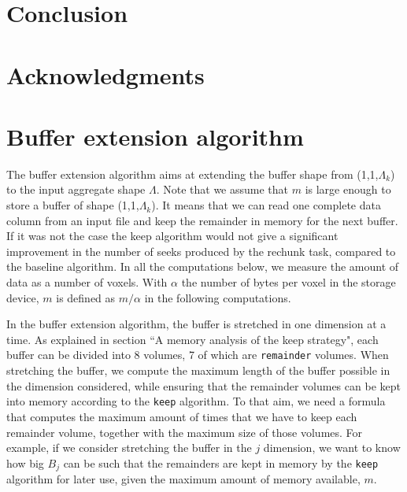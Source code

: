 \documentclass[conference]{IEEEtran}
\begin{document}
\section{Conclusion}

\section{Acknowledgments}




\appendices

\section{Buffer extension algorithm}
\label{bufferExtensionAlgorithm}
The buffer extension algorithm aims at extending the buffer shape from
(1,1,$\Lambda_k$) to the input aggregate shape $\Lambda$. Note that we assume
that $m$ is large enough to store a buffer of shape (1,1,$\Lambda_k$). It means
that we can read one complete data column from an input file and keep the
remainder in memory for the next buffer. If it was not the case the keep
algorithm would not give a significant improvement in the number of seeks
produced by the rechunk task, compared to the baseline algorithm. In all the
computations below, we measure the amount of data as a number of voxels. With
$\alpha$ the number of bytes per voxel in the storage device, $m$ is defined as
$m/\alpha$ in the following computations.

In the buffer extension algorithm, the buffer is stretched in one dimension at a
time. As explained in section ``A memory analysis of the keep strategy", each
buffer can be divided into 8 volumes, 7 of which are \texttt{remainder} volumes.
When stretching the buffer, we compute the maximum length of the buffer possible
in the dimension considered, while ensuring that the remainder volumes can be
kept into memory according to the \texttt{keep} algorithm. To that aim, we need
a formula that computes the maximum amount of times that we have to keep each
remainder volume, together with the maximum size of those volumes. For example, if
we consider stretching the buffer in the $j$ dimension, we want to know how big
$B_j$ can be such that the remainders are kept in memory by the \texttt{keep}
algorithm for later use, given the maximum amount of memory available, $m$.
\end{document}

